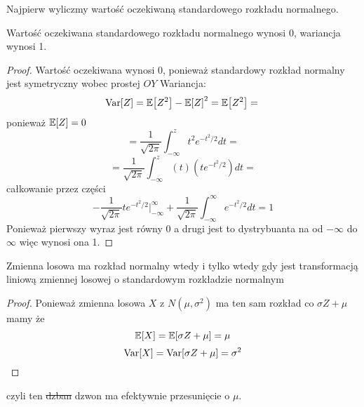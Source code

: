 Najpierw wyliczmy wartość oczekiwaną standardowego rozkładu normalnego.
\begin{theorem}
    Wartość oczekiwana standardowego rozkładu normalnego wynosi 0, wariancja wynosi 1.
\end{theorem}

\begin{proof}
Wartość oczekiwana wynosi 0, ponieważ standardowy rozkład normalny jest symetryczny wobec prostej \( OY\)
Wariancja:
\[
    \variance{Z} = \expected{Z^2} - \expected{Z}^2 = \expected{Z^2} = \\
\]
ponieważ \( \expected{Z} = 0 \)
\[  
    = \frac{1}{\sqrt{2\pi}}\int_{-\infty}^{z}t^2e^{-t^2/2} dt = 
\]
\[
    = \frac{1}{\sqrt{2\pi}}\int_{-\infty}^{z}(t)(te^{-t^2/2}) dt =
\]
całkowanie przez części
\[
    -\frac{1}{\sqrt{2\pi}}te^{-t^2/2}|_{-\infty}^{\infty} + \frac{1}{\sqrt{2\pi}}\int_{-\infty}^{\infty}e^{-t^2/2} dt = 1
\]
Ponieważ pierwszy wyraz jest równy 0 a drugi jest to dystrybuanta na od \(-\infty \) do \( \infty \) więc wynosi ona 1.
\end{proof}

\begin{lemma}
    Zmienna losowa ma rozkład normalny wtedy i tylko wtedy gdy jest transformacją liniową zmiennej losowej o standardowym rozkładzie normalnym
\end{lemma}

\begin{proof}
    Ponieważ zmienna losowa \( X\) z \(N(\mu, \sigma^2) \) ma ten sam rozkład co \( \sigma Z + \mu \) mamy że
    \[\expected{X} = \expected{\sigma Z + \mu} = \mu
    \]
    \[
        \variance{X} = \variance{\sigma Z + \mu} = \sigma^2
    \]
\end{proof}
czyli ten \sout{dzban} dzwon ma efektywnie przesunięcie o \( \mu \).
